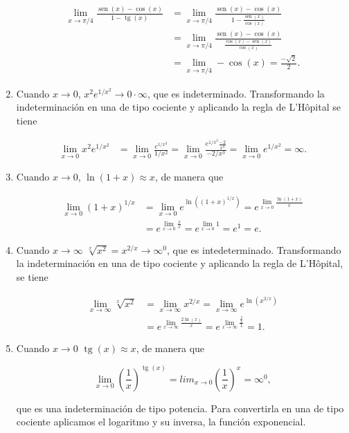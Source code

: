 \documentclass[
  a4paper,
]{scrreport}
\theoremstyle{definition}
\theoremstyle{remark}
\begin{document}
\begin{tcolorbox}
\begin{enumerate}
  \begin{align*}
   \lim_{x\to \pi/4}\frac{\operatorname{sen}(x)-\cos(x)}{1-\operatorname{tg}(x)} &= \lim_{x\to \pi/4}\frac{\operatorname{sen}(x)-\cos(x)}{1-\frac{\operatorname{sen}(x)}{\cos(x)}}\\ 
   & = \lim_{x\to \pi/4}\frac{\operatorname{sen}(x)-\cos(x)}{\frac{\cos(x)-\operatorname{sen}(x)}{\cos(x)}}\\ 
   & = \lim_{x\to \pi/4} -\cos(x) = \frac{-\sqrt{2}}{2}.
   \end{align*}
\item
  Cuando \(x\to 0\), \(x^2e^{1/x^2}\to 0\cdot \infty\), que es
  indeterminado. Transformando la indeterminación en una de tipo
  cociente y aplicando la regla de L'Hôpital se tiene

  \begin{align*}
   \lim_{x\to 0}x^2e^{1/x^2} &= \lim_{x\to 0}\frac{e^{1/x^2}}{1/x^2} = \lim_{x\to 0}\frac{e^{1/x^2}\frac{-2}{x^3}}{-2/x^3} = \lim_{x\to 0} e^{1/x^2} =\infty.
   \end{align*}
\item
  Cuando \(x\to 0\), \(\ln(1+x)\approx x\), de manera que

  \begin{align*}
   \lim_{x\to 0}\left(1+x\right)^{1/x} &= \lim_{x\to 0}e^{\ln(\left(1+x\right)^{1/x})} = e^{\lim_{x\to 0}\frac{\ln(1+x)}{x}}\\  
   &= e^{\lim_{x\to 0}\frac{x}{x}} = e^{\lim_{x\to 0}1} = e^1 = e.
   \end{align*}
\item
  Cuando \(x\to\infty\) \(\sqrt[x]{x^2}=x^{2/x}\to \infty^0\), que es
  intedeterminado. Transformando la indeterminación en una de tipo
  cociente y aplicando la regla de L'Hôpital, se tiene

  \begin{align*}
   \lim_{x\to \infty} \sqrt[x]{x^2} 
   &= \lim_{x\to \infty} x^{2/x} = \lim_{x\to \infty} e^{\ln(x^{2/x})}\\
   & = e^{\lim_{x\to \infty} \frac{2\ln(x)}{x}} = e^{\lim_{x\to \infty} \frac{\frac{2}{x}}{1}} = 1.
   \end{align*}
\item
  Cuando \(x\to 0\) \(\operatorname{tg}(x)\approx x\), de manera que

  \[
  \lim_{x\to 0}\left(\dfrac{1}{x}\right)^{\operatorname{tg}(x)}
  = lim_{x\to 0}\left(\dfrac{1}{x}\right)^x 
  = \infty^0,
  \]

  que es una indeterminación de tipo potencia. Para convertirla en una
  de tipo cociente aplicamos el logaritmo y su inversa, la función
  exponencial.


\end{enumerate}
\end{tcolorbox}
\end{document}
